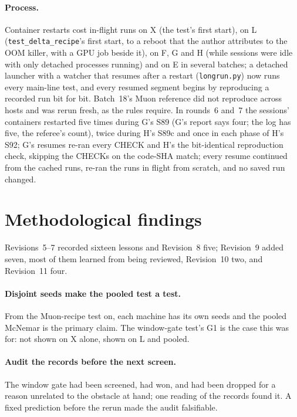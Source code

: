 \documentclass[11pt]{article}
\begin{document}
\paragraph{Process.} Container restarts cost in-flight runs on X (the test's first start), on L (\texttt{test\_delta\_recipe}'s first start, to a reboot that the author attributes to the OOM killer, with a GPU job beside it), on F, G and H (while sessions were idle with only detached processes running) and on E in several batches; a detached launcher with a watcher that resumes after a restart (\texttt{longrun.py}) now runs every main-line test, and every resumed segment begins by reproducing a recorded run bit for bit. Batch~18's Muon reference did not reproduce across hosts and was rerun fresh, as the rules require. In rounds~6 and~7 the sessions' containers restarted five times during G's S89 (G's report says four; the log has five, the referee's count), twice during H's S89c and once in each phase of H's S92; G's resumes re-ran every CHECK and H's the bit-identical reproduction check, skipping the CHECKs on the code-SHA match; every resume continued from the cached runs, re-ran the runs in flight from scratch, and no saved run changed.

\section{Methodological findings}
\label{sec:method}

Revisions~5--7 recorded sixteen lessons and Revision~8 five; Revision~9 added seven, most of them learned from being reviewed, Revision~10 two, and Revision~11 four.

\paragraph{Disjoint seeds make the pooled test a test.} From the Muon-recipe test on, each machine has its own seeds and the pooled McNemar is the primary claim. The window-gate test's G1 is the case this was for: not shown on X alone, shown on L and pooled.

\paragraph{Audit the records before the next screen.} The window gate had been screened, had won, and had been dropped for a reason unrelated to the obstacle at hand; one reading of the records found it. A fixed prediction before the rerun made the audit falsifiable.
\end{document}
